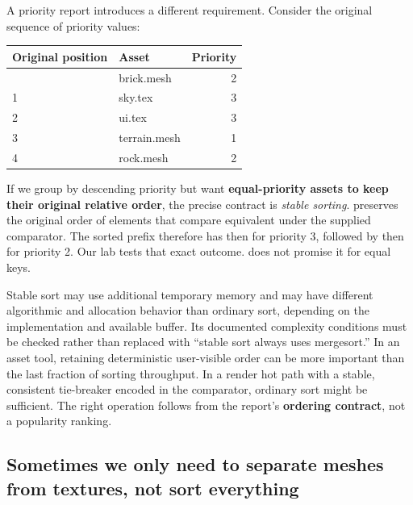 A priority report introduces a different requirement. Consider the original sequence of priority values:

{\def\LTcaptype{none} %
\begin{longtable}[]{@{}llr@{}}
\toprule\noalign{}
Original position & Asset & Priority \\
\midrule\noalign{}
\endhead
\bottomrule\noalign{}
\endlastfoot
0 & brick.mesh & 2 \\
1 & sky.tex & 3 \\
2 & ui.tex & 3 \\
3 & terrain.mesh & 1 \\
4 & rock.mesh & 2 \\
\end{longtable}
}

If we group by descending priority but want \textbf{equal-priority assets to keep their original relative order}, the precise contract is \emph{stable sorting}.  preserves the original order of elements that compare equivalent under the supplied comparator. The sorted prefix therefore has  then  for priority 3, followed by  then  for priority 2. Our lab tests that exact outcome.  does not promise it for equal keys.

Stable sort may use additional temporary memory and may have different algorithmic and allocation behavior than ordinary sort, depending on the implementation and available buffer. Its documented complexity conditions must be checked rather than replaced with ``stable sort always uses mergesort.'' In an asset tool, retaining deterministic user-visible order can be more important than the last fraction of sorting throughput. In a render hot path with a stable, consistent tie-breaker encoded in the comparator, ordinary sort might be sufficient. The right operation follows from the report's \textbf{ordering contract}, not a popularity ranking.

\subsection{Sometimes we only need to separate meshes from textures, not sort everything}\label{05-engine-i-ch006-sometimes-we-only-need-to-separate-meshes-from-textures-not-sort-everything}

